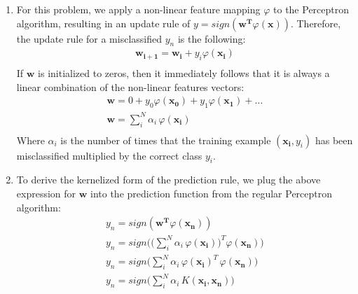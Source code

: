 \documentclass[12pt]{article}
\begin{document}
\begin{enumerate}[label=\alph*.]
	\item For this problem, we apply a non-linear feature mapping $\varphi$ to the Perceptron algorithm, resulting in an update rule of $y = sign(\mathbf{w^T} \varphi(\mathbf{x}))$. Therefore, the update rule for a misclassified $y_n$ is the following:
	\begin{gather*}
		\mathbf{w_{i+1}} = \mathbf{w_i} + y_i \varphi(\mathbf{x_i}) \\
	\end{gather*}
	If $\mathbf{w}$ is initialized to zeros, then it immediately follows that it is always a linear combination of the non-linear features vectors:
	\begin{gather*}
		\mathbf{w} = 0 + y_0 \varphi(\mathbf{x_0}) + y_1 \varphi(\mathbf{x_1}) + \dots \\ 
		\mathbf{w} = \sum^N_{i}{\alpha_i \, \varphi(\mathbf{x_i})} \\
	\end{gather*}
	Where $\alpha_i$ is the number of times that the training example $(\mathbf{x_i}, y_i)$ has been misclassified multiplied by the correct class $y_i$.
	
	\item To derive the kernelized form of the prediction rule, we plug the above expression for $\mathbf{w}$ into the prediction function from the regular Perceptron algorithm:
	\begin{gather*}
		y_n = sign(\mathbf{w^T} \varphi(\mathbf{x_n})) \\
		y_n = sign \bigg( \bigg( \sum^N_{i}{\alpha_i \, \varphi(\mathbf{x_i})} \bigg)^T \varphi(\mathbf{x_n}) \bigg) \\ 
		y_n = sign \bigg( \sum^N_{i}{\alpha_i \, \varphi(\mathbf{x_i})^T \, \varphi(\mathbf{x_n})} \bigg) \\
		y_n = sign \bigg( \sum^N_{i}{\alpha_i \, K( \mathbf{x_i}, \mathbf{x_n} )} \bigg)
	\end{gather*}
	

\end{enumerate}
\end{document}
